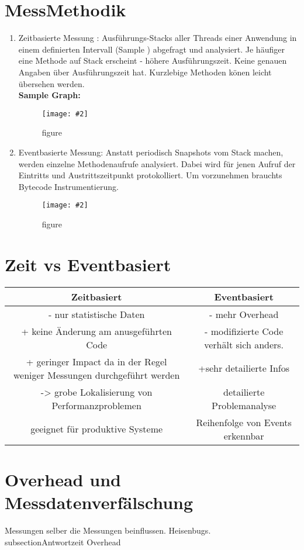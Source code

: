 \documentclass[a4paper,10pt]{scrreprt}
\newcommand{\pic}[2][figure]{\begin{figure}[h]
 \centering
 \texttt{[image: \#2]}
 \caption{#1}
\end{figure}
}
\begin{document}
\section{MessMethodik} %
\label{sec:messmethodik}
\begin{enumerate}
	\item Zeitbasierte Messung : Ausführungs-Stacks aller Threads einer Anwendung in einem definierten Intervall (Sample ) abgefragt und analysiert. Je häufiger eine Methode auf Stack erscheint - höhere Ausführungszeit. Keine genauen Angaben über Ausführungszeit hat. Kurzlebige Methoden könen leicht übersehen werden.\\
	\textbf{Sample Graph:}
	\pic{zm.png}
	\item Eventbasierte Messung: Anstatt periodisch Snapshots vom Stack machen, werden einzelne Methodenaufrufe analysiert. Dabei wird für jenen Aufruf der Eintritts und Austrittszeitpunkt protokolliert. Um vorzunehmen brauchts Bytecode Instrumentierung.
	\pic{em.png}
\end{enumerate}
\section{Zeit vs Eventbasiert} %
\label{sec:zeit_vs_eventbasiert}
\begin{tabular}{|c|c|}
Zeitbasiert & Eventbasiert \\ \hline
- nur statistische Daten & - mehr Overhead \\ \hline
+ keine Änderung am anusgeführten Code & - modifizierte Code verhält sich anders. \\ \hline
+ geringer Impact da in der Regel weniger Messungen durchgeführt werden & +sehr detailierte Infos \\ \hline
-> grobe Lokalisierung von Performanzproblemen & detailierte Problemanalyse \\ \hline
geeignet für produktive Systeme & Reihenfolge von Events erkennbar \\ \hline
\end{tabular}

\section{Overhead und Messdatenverfälschung} %
\label{sec:overhead_und_messdatenverf_lschung}
Messungen selber die Messungen beinflussen. Heisenbugs.
\\subsection{Antwortzeit Overhead} %
\label{sub:antwortzeit_overhead}
\end{document}
